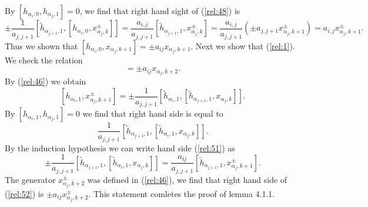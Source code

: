 \documentclass[english]{elsarticle}
\numberwithin{equation}{section}
\begin{document}
By $[h_{\alpha_i,0},h_{\alpha_j,1}]=0$, we find that right hand sight of (\ref{rel:48}) is
\begin{equation}
    \pm \frac{1}{a_{j,j+1}}[\tilde{h}_{\alpha_{j+1},1},[h_{\alpha_i,0},x_{\alpha_j,k}^{\pm}]]=\frac{a_{i,j}}{a_{j,j+1}}[\tilde{h}_{\alpha_{j+1},1},x_{\alpha_j,k}^{\pm}]=\frac{a_{i,j}}{a_{j,j+1}}(\pm a_{j,j+1}x_{\alpha_j,k+1}^{\pm})=a_{i,j}x_{\alpha_j,k+1}^{\pm}.
\end{equation}
Thus we shown that $[h_{\alpha_i,0},x_{\alpha_j,k+1}]=\pm a_{ij}x_{\alpha_j,k+1}$.
Next we show that (\ref{rel:1}). We check the relation
\begin{equation}
    [h_{\alpha_i,1},x_{\alpha_j,k+1}^{\pm}]=\pm a_{ij}x_{\alpha_j,k+2}.
\end{equation}
By (\ref{rel:46}) we obtain
\begin{equation}
\label{rel:51}
     [h_{\alpha_i,1},x_{\alpha_j,k+1}^{\pm}]=\pm \frac{1}{a_{j,j+1}}[\tilde{h}_{\alpha_i,1},[\tilde{h}_{\alpha_{j+1},1},x_{\alpha_j,k}]].
\end{equation}
By $[h_{\alpha_i,1},h_{\alpha_j,1}]=0$ we find that right hand side is equal to
\[
\frac{1}{a_{j,j+1}}[\tilde{h}_{\alpha_{j+1},1},[\tilde{h}_{\alpha_i,1},x_{\alpha_j,k}]].
\]
By the induction hypothesis we can write hand side (\ref{rel:51}) as
\begin{equation}
    \label{rel:52}
    \pm \frac{1}{a_{j,j+1}}[\tilde{h}_{\alpha_{j+1},1},[\tilde{h}_{\alpha_i,1},x_{\alpha_j,k}]]=\frac{a_{ij}}{a_{j,j+1}}[\tilde{h}_{\alpha_{j+1},1},x_{\alpha_j,k+1}^{\pm}].
\end{equation}
The generator $x_{\alpha_j,k+2}^{\pm}$ was defined in (\ref{rel:46}), we find that right hand side of (\ref{rel:52}) is $\pm a_{ij}x_{\alpha_j,k+2}^{\pm}$. This statement comletes the proof of lemma 4.1.1.
\end{document}
